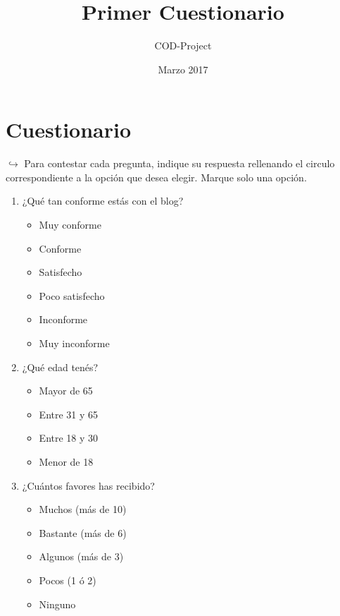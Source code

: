 \documentclass[a4paper,10pt]{article}
\title{Primer Cuestionario}
\author{COD-Project}
\date{Marzo 2017}
\begin{document}
\maketitle

\renewcommand{\labelitemi}{$\bigcirc$}

\section{Cuestionario}
$\hookrightarrow{}$ Para contestar cada pregunta, indique su respuesta rellenando el circulo correspondiente a la opción que desea elegir. Marque solo una opción.
\begin{enumerate}
    \item ¿Qué tan conforme estás con el blog?
    \begin{itemize}
        \item Muy conforme
        \item Conforme
        \item Satisfecho
        \item Poco satisfecho
        \item Inconforme
        \item Muy inconforme
    \end{itemize}
    
    \item ¿Qué edad tenés?
    \begin{itemize}
        \item Mayor de 65
        \item Entre 31 y 65
        \item Entre 18 y 30
        \item Menor de 18
    \end{itemize}
    
    \item ¿Cuántos favores has recibido?
    \begin{itemize}
        \item Muchos (más de 10)
        \item Bastante (más de 6)
        \item Algunos (más de 3)
        \item Pocos (1 ó 2)
        \item Ninguno
    \end{itemize}
    

\end{enumerate}
\end{document}
